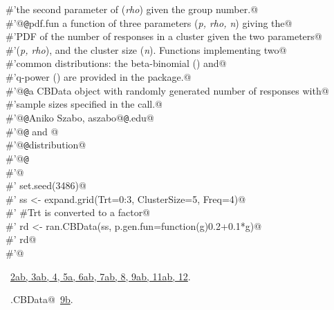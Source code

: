 \documentclass[reqno]{amsart}
\renewcommand{\NWlink}[2]{\hyperlink{#1}{#2}}
\begin{document}
\begin{flushleft}
\begin{list}{}{}
\mbox{}\verb@#'the second parameter of  (\emph{rho}) given the group number.@\\
\mbox{}\verb@#'@{\tt @}\verb@param pdf.fun a function of three parameters (\emph{p, rho, n}) giving the@\\
\mbox{}\verb@#'PDF of the number of responses in a cluster given the two parameters@\\
\mbox{}\verb@#'(\emph{p, rho}), and the cluster size (\emph{n}). Functions implementing two@\\
\mbox{}\verb@#'common distributions: the beta-binomial () and@\\
\mbox{}\verb@#'q-power () are provided in the package.@\\
\mbox{}\verb@#'@{\tt @}\verb@return a CBData object with randomly generated number of responses with@\\
\mbox{}\verb@#'sample sizes specified in the call.@\\
\mbox{}\verb@#'@{\tt @}\verb@author Aniko Szabo, aszabo@{\tt @}\verb@mcw.edu@\\
\mbox{}\verb@#'@{\tt @}\verb@seealso {} and @\\
\mbox{}\verb@#'@{\tt @}\verb@keywords distribution@\\
\mbox{}\verb@#'@{\tt @}\verb@examples@\\
\mbox{}\verb@#'@\\
\mbox{}\verb@#' set.seed(3486)@\\
\mbox{}\verb@#' ss <- expand.grid(Trt=0:3, ClusterSize=5, Freq=4)@\\
\mbox{}\verb@#' #Trt is converted to a factor@\\
\mbox{}\verb@#' rd <- ran.CBData(ss, p.gen.fun=function(g)0.2+0.1*g)@\\
\mbox{}\verb@#' rd@\\
\mbox{}\verb@#'@\\
\mbox{}\verb@@{\NWsep}
\end{list}
\vspace{-1.5ex}
\footnotesize
\begin{list}{}{\setlength{\itemsep}{-\parsep}\setlength{\itemindent}{-\leftmargin}}
\item \NWtxtFileDefBy\ \NWlink{nuweb2a}{2a}\NWlink{nuweb2b}{b}\NWlink{nuweb3a}{, 3a}\NWlink{nuweb3b}{b}\NWlink{nuweb4}{, 4}\NWlink{nuweb5a}{, 5a}\NWlink{nuweb6a}{, 6a}\NWlink{nuweb6b}{b}\NWlink{nuweb7a}{, 7a}\NWlink{nuweb7b}{b}\NWlink{nuweb8}{, 8}\NWlink{nuweb9a}{, 9a}\NWlink{nuweb9b}{b}\NWlink{nuweb11a}{, 11a}\NWlink{nuweb11b}{b}\NWlink{nuweb12}{, 12}.
\item \NWtxtIdentsUsed\nobreak\  \verb@ran.CBData@\nobreak\ \NWlink{nuweb9b}{9b}.
\item{}
\end{list}
\vspace{4ex}
\end{flushleft}
\end{document}
